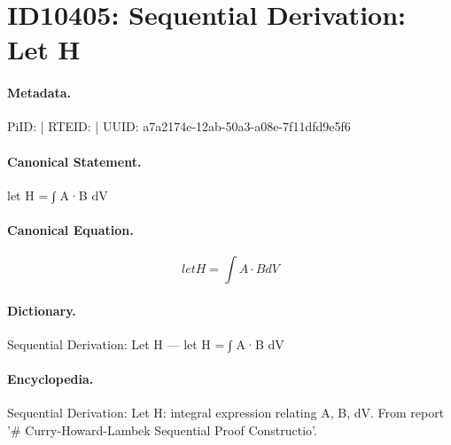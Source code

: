 \section*{ID10405: Sequential Derivation: Let H}
\paragraph{Metadata.}
PiID:  | RTEID:  | UUID: a7a2174e-12ab-50a3-a08e-7f11dfd9e5f6

\paragraph{Canonical Statement.}
let H = ∫ A·B dV

\paragraph{Canonical Equation.}
\[
let H = ∫ A·B dV
\]

\paragraph{Dictionary.}
Sequential Derivation: Let H — let H = ∫ A·B dV

\paragraph{Encyclopedia.}
Sequential Derivation: Let H: integral expression relating A, B, dV. From report '\# Curry-Howard-Lambek Sequential Proof Constructio'.
